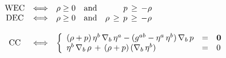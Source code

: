 \documentclass [12] {article}
\theoremstyle{plain}
\numberwithin{figure}{subsection}
\numberwithin{proposition}{subsection}
\begin{document}


\begin{center}
$
\begin{array}{ccl }
	\textrm{WEC} & \Longleftrightarrow & \rho \geq 0  \hspace{1em}  \textrm{and}   \hspace{3.2em}   p  \, \geq  \,  - \rho  \\ 
      \textrm{DEC} & \Longleftrightarrow & \rho \geq 0  \hspace{1em}  \textrm{and}   \hspace{1em}   \rho  \, \geq  \, p  \, \geq \,  -\rho \\

		{} & {}  & {}  \\ 
	\textrm{CC} & \Longleftrightarrow & \left\{
	\begin{array}{lcl}
	(\rho + p) \, \eta^b \, \nabla_b  \, \eta^a  - (g^{ab}  - \eta^a \, \eta^b) \, \nabla_b  \, p  &=& \mathbf{0}     \\
	\eta^b \, \nabla_b  \, \rho  \, + \,  (\rho + p)  \, (\nabla_b  \, \eta^b) &=&  0    
	\end{array}
	\right.  
\end{array}
$
\end{center}

\end{document}
